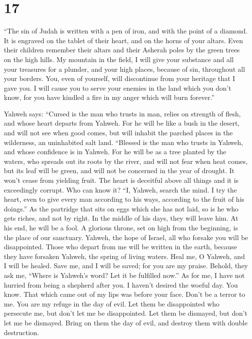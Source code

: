 \hypertarget{section-16}{%
\section{17}\label{section-16}}

 ``The sin of Judah is written with a pen of iron, and
with the point of a diamond. It is engraved on the tablet of their
heart, and on the horns of your altars.  Even their
children remember their altars and their Asherah poles by the green
trees on the high hills.  My mountain in the field, I will
give your substance and all your treasures for a plunder, and your high
places, because of sin, throughout all your borders.  You,
even of yourself, will discontinue from your heritage that I gave you. I
will cause you to serve your enemies in the land which you don't know,
for you have kindled a fire in my anger which will burn forever.''

 Yahweh says: ``Cursed is the man who trusts in man,
relies on strength of flesh, and whose heart departs from Yahweh.
 For he will be like a bush in the desert, and will not
see when good comes, but will inhabit the parched places in the
wilderness, an uninhabited salt land.  ``Blessed is the
man who trusts in Yahweh, and whose confidence is in Yahweh.
 For he will be as a tree planted by the waters, who
spreads out its roots by the river, and will not fear when heat comes,
but its leaf will be green, and will not be concerned in the year of
drought. It won't cease from yielding fruit.  The heart is
deceitful above all things and it is exceedingly corrupt. Who can know
it?  ``I, Yahweh, search the mind. I try the heart, even
to give every man according to his ways, according to the fruit of his
doings.''  As the partridge that sits on eggs which she
has not laid, so is he who gets riches, and not by right. In the middle
of his days, they will leave him. At his end, he will be a fool.
 A glorious throne, set on high from the beginning, is
the place of our sanctuary.  Yahweh, the hope of Israel,
all who forsake you will be disappointed. Those who depart from me will
be written in the earth, because they have forsaken Yahweh, the spring
of living waters.  Heal me, O Yahweh, and I will be
healed. Save me, and I will be saved; for you are my praise.
 Behold, they ask me, ``Where is Yahweh's word? Let it be
fulfilled now.''  As for me, I have not hurried from
being a shepherd after you. I haven't desired the woeful day. You know.
That which came out of my lips was before your face. 
Don't be a terror to me. You are my refuge in the day of evil.
 Let them be disappointed who persecute me, but don't let
me be disappointed. Let them be dismayed, but don't let me be dismayed.
Bring on them the day of evil, and destroy them with double destruction.

